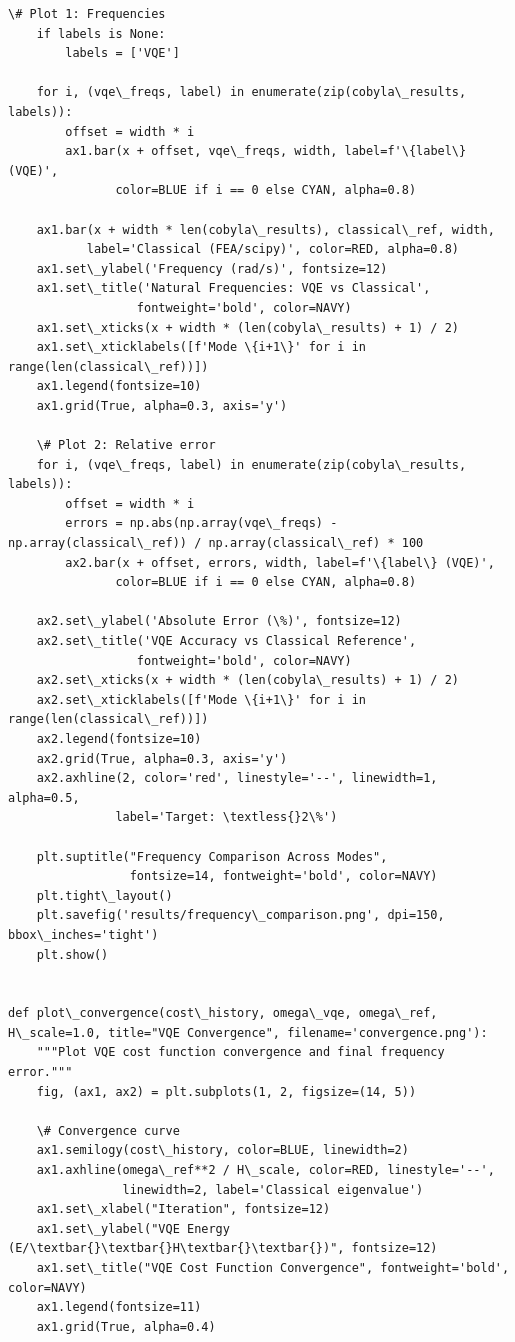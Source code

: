 \documentclass[12pt, a4paper]{article}
\begin{document}
\begin{lstlisting}[style=codestyle, caption={{visualize.py --- Beam and Truss Visualizations}}]
    \# Plot 1: Frequencies
    if labels is None:
        labels = ['VQE']

    for i, (vqe\_freqs, label) in enumerate(zip(cobyla\_results, labels)):
        offset = width * i
        ax1.bar(x + offset, vqe\_freqs, width, label=f'\{label\} (VQE)',
               color=BLUE if i == 0 else CYAN, alpha=0.8)

    ax1.bar(x + width * len(cobyla\_results), classical\_ref, width,
           label='Classical (FEA/scipy)', color=RED, alpha=0.8)
    ax1.set\_ylabel('Frequency (rad/s)', fontsize=12)
    ax1.set\_title('Natural Frequencies: VQE vs Classical',
                  fontweight='bold', color=NAVY)
    ax1.set\_xticks(x + width * (len(cobyla\_results) + 1) / 2)
    ax1.set\_xticklabels([f'Mode \{i+1\}' for i in range(len(classical\_ref))])
    ax1.legend(fontsize=10)
    ax1.grid(True, alpha=0.3, axis='y')

    \# Plot 2: Relative error
    for i, (vqe\_freqs, label) in enumerate(zip(cobyla\_results, labels)):
        offset = width * i
        errors = np.abs(np.array(vqe\_freqs) - np.array(classical\_ref)) / np.array(classical\_ref) * 100
        ax2.bar(x + offset, errors, width, label=f'\{label\} (VQE)',
               color=BLUE if i == 0 else CYAN, alpha=0.8)

    ax2.set\_ylabel('Absolute Error (\%)', fontsize=12)
    ax2.set\_title('VQE Accuracy vs Classical Reference',
                  fontweight='bold', color=NAVY)
    ax2.set\_xticks(x + width * (len(cobyla\_results) + 1) / 2)
    ax2.set\_xticklabels([f'Mode \{i+1\}' for i in range(len(classical\_ref))])
    ax2.legend(fontsize=10)
    ax2.grid(True, alpha=0.3, axis='y')
    ax2.axhline(2, color='red', linestyle='--', linewidth=1, alpha=0.5,
               label='Target: \textless{}2\%')

    plt.suptitle("Frequency Comparison Across Modes",
                 fontsize=14, fontweight='bold', color=NAVY)
    plt.tight\_layout()
    plt.savefig('results/frequency\_comparison.png', dpi=150, bbox\_inches='tight')
    plt.show()


def plot\_convergence(cost\_history, omega\_vqe, omega\_ref, H\_scale=1.0, title="VQE Convergence", filename='convergence.png'):
    """Plot VQE cost function convergence and final frequency error."""
    fig, (ax1, ax2) = plt.subplots(1, 2, figsize=(14, 5))

    \# Convergence curve
    ax1.semilogy(cost\_history, color=BLUE, linewidth=2)
    ax1.axhline(omega\_ref**2 / H\_scale, color=RED, linestyle='--',
                linewidth=2, label='Classical eigenvalue')
    ax1.set\_xlabel("Iteration", fontsize=12)
    ax1.set\_ylabel("VQE Energy (E/\textbar{}\textbar{}H\textbar{}\textbar{})", fontsize=12)
    ax1.set\_title("VQE Cost Function Convergence", fontweight='bold', color=NAVY)
    ax1.legend(fontsize=11)
    ax1.grid(True, alpha=0.4)


\end{lstlisting}
\end{document}
